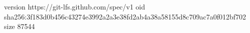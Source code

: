 version https://git-lfs.github.com/spec/v1
oid sha256:3f183d0b456c43274e3992a2a3e38fd2ab4a38a58155d8c709ac7a0f012bf702
size 87544
